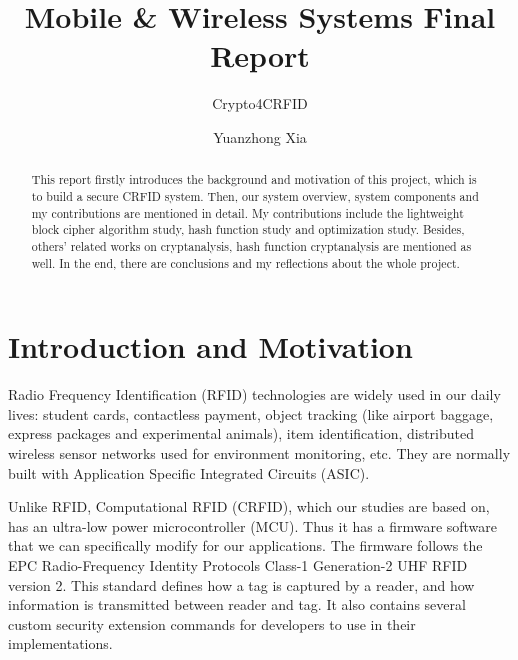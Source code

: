 \documentclass[sigconf, review=false]{acmart}
\let\OldTexttrademark\texttrademark
\renewcommand{\texttrademark}{\OldTexttrademark\xspace}%
\begin{document}
\title{Mobile \& Wireless Systems Final Report}
\subtitle{Crypto4CRFID}

\author{Yuanzhong Xia}

\begin{abstract}
    This report firstly introduces the background and motivation of this project, which is to build a secure CRFID system.
    Then, our system overview, system components and my contributions are mentioned in detail.
    My contributions include the lightweight block cipher algorithm study, hash function study and optimization study.
    Besides, others' related works on cryptanalysis, hash function cryptanalysis are mentioned as well.
    In the end, there are conclusions and my reflections about the whole project.
\end{abstract}
\maketitle



\section{Introduction and Motivation}
Radio Frequency Identification (RFID) technologies are widely used in our daily lives:
student cards, contactless payment, object tracking (like airport baggage, express packages and experimental animals),
item identification, distributed wireless sensor networks used for environment monitoring, etc. \cite{wikipedia2017rfid}
They are normally built with Application Specific Integrated Circuits (ASIC).

Unlike RFID, Computational RFID (CRFID), which our studies are based on, has an ultra-low power microcontroller (MCU).
Thus it has a firmware software that we can specifically modify for our applications.
The firmware follows the EPC\texttrademark Radio-Frequency Identity Protocols Class-1 Generation-2 UHF RFID version 2\cite{epcglobal2013}.
This standard defines how a tag is captured by a reader, and how information is transmitted between reader and tag.
It also contains several custom security extension commands for developers to use in their implementations.
\end{document}
